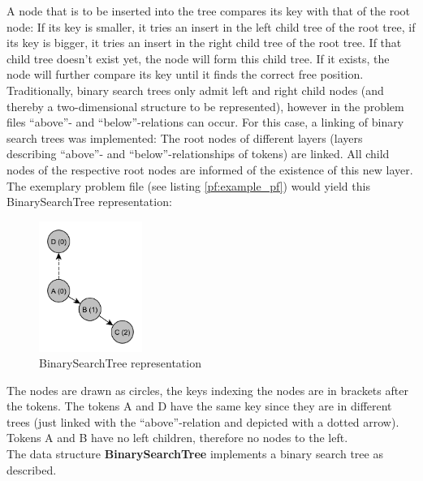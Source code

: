\documentclass[hidelinks]{scrartcl}
\begin{document}
A node that is to be inserted into the tree compares its key with that of the root node: If its key is smaller, it tries an insert in the left child tree of the root tree, if its key is bigger, it tries an insert in the right child tree of the root tree. If that child tree doesn't exist yet, the node will form this child tree. If it exists, the node will further compare its key until it finds the correct free position. \\

Traditionally, binary search trees only admit left and right child nodes (and thereby a two-dimensional structure to be represented), however in the problem files ``above''- and ``below''-relations can occur. For this case, a linking of binary search trees was implemented: The root nodes of different layers (layers describing ``above''- and ``below''-relationships of tokens) are linked. All child nodes of the respective root nodes are informed of the existence of this new layer. \\

\noindent The exemplary problem file (see listing \ref{pf:example_pf}) would yield this BinarySearchTree representation:

\begin{figure}[H]
	\caption{BinarySearchTree representation}
	\label{img:binarysearchtree_example_pf}
	\centering
	\includegraphics[width=0.3\textwidth]{Illustrations/BinarySearchTree.pdf}
\end{figure}

The nodes are drawn as circles, the keys indexing the nodes are in brackets after the tokens. The tokens A and D have the same key since they are in different trees (just linked with the ``above''-relation and depicted with a dotted arrow). Tokens A and B have no left children, therefore no nodes to the left. \\
The data structure \textbf{BinarySearchTree} implements a binary search tree as described. \\
\end{document}
